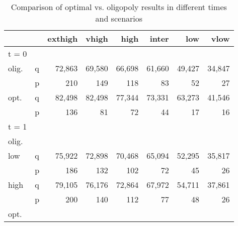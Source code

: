 \begin{table}
\centering
\caption{Comparison of optimal vs. oligopoly results in different times and scenarios}
\begin{tabular}{llrrrrrr}
\hline
\hline
           &            &    exthigh &      vhigh &       high &      inter &        low &       vlow \\
\hline
     t = 0 &            &            &            &            &            &            &            \\
\hline
 olig. &          q &     72,863 &     69,580 &     66,698 &     61,660 &     49,427 &     34,847 \\

           &          p &        210 &        149 &        118 &         83 &         52 &         27 \\
\hline
   opt. &          q &     82,498 &     82,498 &     77,344 &     73,331 &     63,273 &     41,546 \\

           &          p &        136 &         81 &         72 &         44 &         17 &         16 \\
\hline
\hline
     t = 1 &            &            &            &            &            &            &            \\

 olig. &            &            &            &            &            &            &            \\

       low &          q &     75,922 &     72,898 &     70,468 &     65,094 &     52,295 &     35,817 \\

           &          p &        186 &        132 &        102 &         72 &         45 &         26 \\

      high &          q &     79,105 &     76,176 &     72,864 &     67,972 &     54,711 &     37,861 \\

           &          p &        200 &        140 &        112 &         77 &         48 &         26 \\
\hline
   opt. &            &            &            &            &            &            &            \\


\end{tabular}
\end{table}
